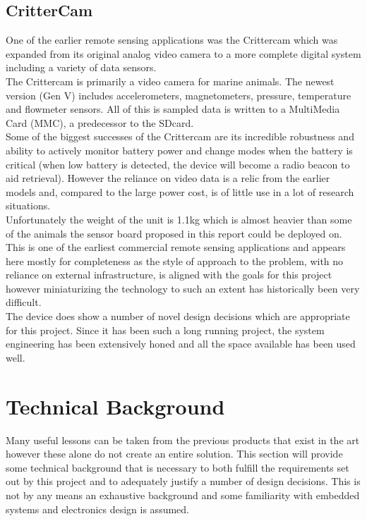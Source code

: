\documentclass[12pt,openany,a4paper]{book}
\begin{document}
		\newpage
		\subsection{CritterCam}
			One of the earlier remote sensing applications was the Crittercam \cite{Marshall07} which was expanded from its original analog video camera to a more complete digital system including a variety of data sensors. \\
			
			The Crittercam is primarily a video camera for marine animals. The newest version (Gen V) includes accelerometers, magnetometers, pressure, temperature and flowmeter sensors. All of this is sampled data is written to a MultiMedia Card (MMC), a predecessor to the SDcard. \\
			
			 Some of the biggest successes of the Crittercam are its incredible robustness and ability to actively monitor battery power and change modes when the battery is critical (when low battery is detected, the device will become a radio beacon to aid retrieval). However the reliance on video data is a relic from the earlier models and, compared to the large power cost, is of little use in a lot of research situations.\\
			 
			  Unfortunately the weight of the unit is 1.1kg which is almost heavier than some of the animals the sensor board proposed in this report could be deployed on. This is one of the earliest commercial remote sensing applications and appears here mostly for completeness as the style of approach to the problem, with no reliance on external infrastructure, is aligned with the goals for this project however miniaturizing the technology to such an extent has historically been very difficult.\\
			  
			  The device does show a number of novel design decisions which are appropriate for this project. Since it has been such a long running project, the system engineering has been extensively honed and all the space available has been used well. 
	\newpage
	\section{Technical Background}
		Many useful lessons can be taken from the previous products that exist in the art however these alone do not create an entire solution. This section will provide some technical background that is necessary to both fulfill the requirements set out by this project and to adequately justify a number of design decisions. This is not by any means an exhaustive background and some familiarity with embedded systems and electronics design is assumed. \\
		
\end{document}
